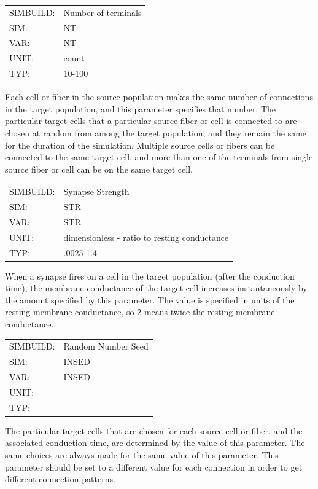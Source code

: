 \documentclass[12pt,openany,oneside]{book}
\begin{document}
\begin{flushleft}
\begin{tabular}{@{}ll@{}}
SIMBUILD: & Number of terminals\\
SIM: & NT\\
VAR: & NT\\
UNIT: & count\\
TYP: & 10-100\\
\end{tabular}
\end{flushleft}
\noindent
Each cell or fiber in the source population makes the same number of
connections in the target population, and this parameter specifies
that number. The particular target cells that a particular source
fiber or cell is connected to are chosen at random from among the
target population, and they remain the same for the duration of the
simulation. Multiple source cells or fibers can be connected to the
same target cell, and more than one of the terminals from single
source fiber or cell can be on the same target cell.
\filbreak
\vspace{\baselineskip}

\begin{flushleft}
\begin{tabular}{@{}ll@{}}
SIMBUILD: & Synapse Strength\\
SIM: & STR\\
VAR: & STR\\
UNIT: & dimensionless - ratio to resting conductance\\
TYP: & .0025-1.4\\
\end{tabular}
\end{flushleft}
\noindent
When a synapse fires on a cell in the target population (after the
conduction time), the membrane conductance of the target cell
increases instantaneously by the amount specified by this parameter.
The value is specified in units of the resting membrane conductance,
so 2 means twice the resting membrane conductance.
\filbreak
\vspace{\baselineskip}

\begin{flushleft}
\begin{tabular}{@{}ll@{}}
SIMBUILD: & Random Number Seed\\
SIM: & INSED\\
VAR: & INSED\\
UNIT: &\\
TYP: &\\
\end{tabular}
\end{flushleft}
\noindent
The particular target cells that are chosen for each source cell or
fiber, and the associated conduction time, are determined by the value
of this parameter. The same choices are always made for the same
value of this parameter. This parameter should be set to a different
value for each connection in order to get different connection
patterns.
\filbreak
\vspace{\baselineskip}
\end{document}
